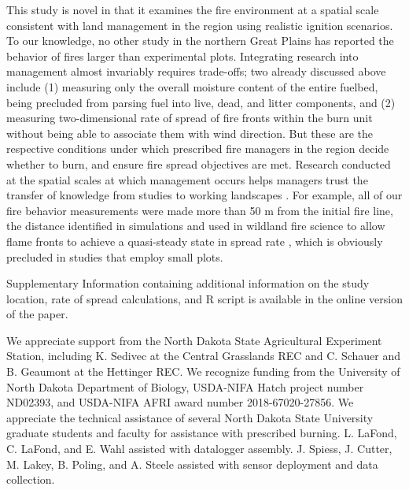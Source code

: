 \documentclass[referee, 
		     sn-basic]{sn-jnl}
\begin{document}
\begin{linenumbers}
This study is novel in that it examines the fire environment at a spatial scale consistent with land management in the region using
realistic ignition scenarios. 
To our knowledge, no other study in the northern Great Plains has reported the behavior of fires larger than experimental plots. Integrating research into management almost invariably requires trade-offs; two already discussed above include (1)
measuring only the overall moisture content of the entire fuelbed, being
precluded from parsing fuel into live, dead, and litter components, and
(2) measuring two-dimensional rate of spread of fire fronts within the
burn unit without being able to associate them with wind direction. But
these are the respective conditions under which prescribed fire managers
in the region decide whether to burn, and ensure fire spread objectives
are met. Research conducted at the spatial scales at which management
occurs helps managers trust the transfer of knowledge from studies to
working landscapes \citep{sayre2005, cacciapaglia2012}. For example, all
of our fire behavior measurements were made more than 50 m from the
initial fire line, the distance identified in simulations and used in
wildland fire science to allow flame fronts to achieve a quasi-steady
state in spread rate \citep{fernandes2000, sutherland2020}, which is
obviously precluded in studies that employ small plots.

\backmatter


Supplementary Information containing additional information on the study location, rate of spread calculations, and \textsf{R} script is available in the online version of the paper.


We appreciate support from the North Dakota State Agricultural Experiment Station, including K. Sedivec at the Central Grasslands REC and C. Schauer and B. Geaumont at the Hettinger REC. 
We recognize funding from the University of North Dakota Department of Biology, USDA-NIFA Hatch project number ND02393, and USDA-NIFA AFRI award number 2018-67020-27856. 
We appreciate the technical assistance of several North Dakota State University graduate students and faculty for assistance with prescribed burning. 
L. LaFond, C. LaFond, and E. Wahl assisted with datalogger assembly. J. Spiess, J. Cutter, M. Lakey, B. Poling, and A. Steele assisted with sensor deployment and data collection.

 

\end{linenumbers}
\end{document}
